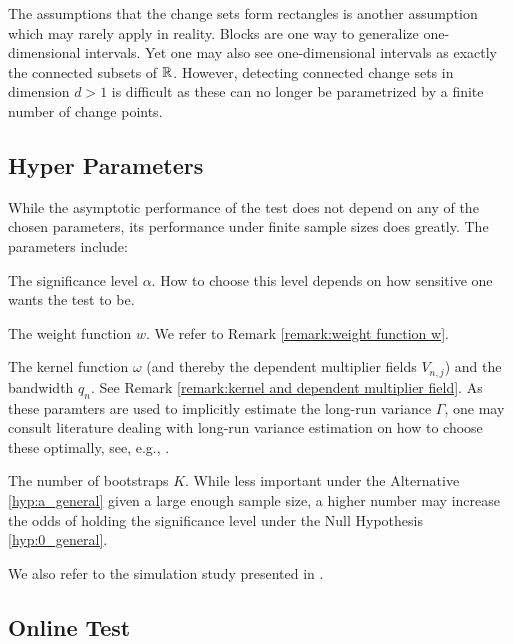 The assumptions that the change sets form rectangles is another assumption which may rarely apply in reality. Blocks are one way to generalize one-dimensional intervals. Yet one may also see one-dimensional intervals as exactly the connected subsets of $\mathbb{R}$. However, detecting connected change sets in dimension $d>1$ is difficult as these can no longer be parametrized by a finite number of change points.


\subsection{Hyper Parameters}

While the asymptotic performance of the test does not depend on any of the chosen parameters, its performance under finite sample sizes does greatly. The parameters include:

\begin{aufzi}
    \item The significance level $\alpha$. How to choose this level depends on how sensitive one wants the test to be.
    \item The weight function $w$. We refer to Remark \ref{remark:weight function w}.
    \item The kernel function $\omega$ (and thereby the dependent multiplier fields $V_{n, j}$) and the bandwidth $q_n$. See Remark \ref{remark:kernel and dependent multiplier field}. As these paramters are used to implicitly estimate the long-run variance $\Gamma$, one may consult literature dealing with long-run variance estimation on how to choose these optimally, see, e.g., \cite{muller2007lrv}.
    \item The number of bootstraps $K$. While less important under the Alternative \ref{hyp:a_general} given a large enough sample size, a higher number may increase the odds of holding the significance level under the Null Hypothesis \ref{hyp:0_general}.
\end{aufzi}

We also refer to the simulation study presented in \cite{[0]BUCCHIA2017344}.

\subsection{Online Test}

